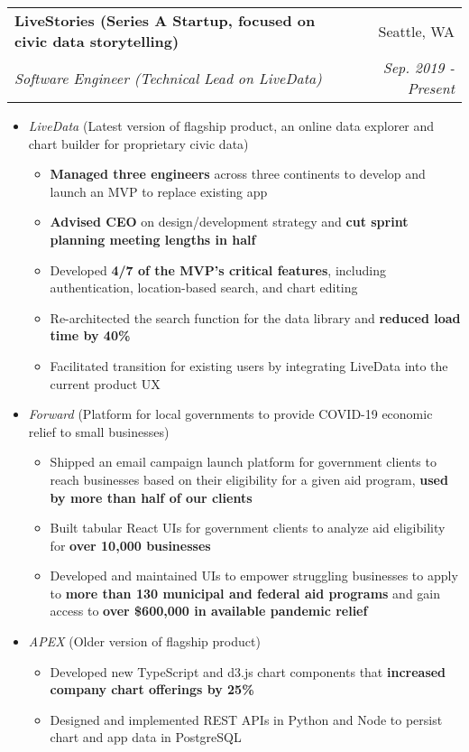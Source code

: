 \documentclass[letterpaper,11pt]{article}
\makeatletter
\newcommand{\resumeItemNoTitleTopPadding}[1]{\vspace{0.5pt} \item\small #1 \vspace{-2pt}}
\newcommand{\resumeItemNoTitle}[1]{\item\small #1 \vspace{-2pt}}
\newcommand{\resumeSubheading}[4]{
  \vspace{-1pt}\item
    \begin{tabular*}{0.97\textwidth}[t]{l@{\extracolsep{\fill}}r}
      \textbf{#1} & #2 \\
      \textit{\small#3} & \textit{\small #4} \\
    \end{tabular*}\vspace{-5pt}
}
\newcommand{\resumeItemListStart}{\begin{itemize}[leftmargin=*]}
\newcommand{\resumeListEnd}{\end{itemize}}
\makeatother
\begin{document}
    \resumeSubheading
      {LiveStories (Series A Startup, focused on civic data storytelling)}{Seattle, WA}
      {Software Engineer (Technical Lead on \textup{LiveData})}{Sep. 2019 - Present}
      \resumeItemListStart
        \resumeItemNoTitle {\textit{LiveData} (Latest version of flagship product, an  online data explorer and chart builder for proprietary civic data)}
        \resumeItemListStart
          \resumeItemNoTitle {\textbf{Managed three engineers} across three continents to develop and launch an MVP to replace existing app}
          \resumeItemNoTitle{\textbf{Advised CEO} on design/development strategy and \textbf{cut sprint planning meeting lengths in half}}
          \resumeItemNoTitle {Developed \textbf{4/7 of the MVP's critical features}, including authentication, location-based search, and chart editing} \resumeItemNoTitle {Re-architected the search function for the data library and \textbf{reduced load time by 40\%}}
          \resumeItemNoTitle {Facilitated transition for existing users by integrating LiveData into the current product UX}
        \end{itemize}
        \resumeItemNoTitleTopPadding {\textit{Forward} (Platform for local governments to provide COVID-19 economic relief to small businesses)}
        \resumeItemListStart
          \resumeItemNoTitle {Shipped an email campaign launch platform for government clients to reach businesses based on their eligibility for a given aid program, \textbf{used by more than half of our clients}}
          \resumeItemNoTitle {Built tabular React UIs for government clients to analyze aid eligibility for \textbf{over 10,000 businesses}} \resumeItemNoTitle {Developed and maintained UIs to empower struggling businesses to apply to \textbf{more than 130 municipal and federal aid programs} and gain access to \textbf{over \$600,000 in available pandemic relief}}
        \end{itemize}
        \resumeItemNoTitleTopPadding {\textit{APEX} (Older version of flagship product)}
        \resumeItemListStart
          \resumeItemNoTitle {Developed new TypeScript and d3.js chart components that \textbf{increased company chart offerings by 25\%}}
          \resumeItemNoTitle {Designed and implemented REST APIs in Python and Node to persist chart and app data in PostgreSQL}
        \end{itemize}
      \resumeListEnd
      
\end{document}
